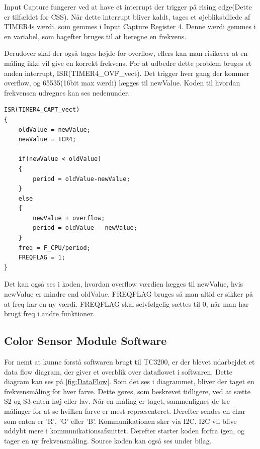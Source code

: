 Input Capture \cite{man:mega2560Kap17} fungerer ved at have et interrupt der trigger på rising edge(Dette er tilfældet for CSS). Når dette interrupt bliver kaldt, tages et øjebliksbillede af TIMER4s værdi, som gemmes i Input Capture Register 4. Denne værdi gemmes i en variabel, som bagefter bruges til at beregne en frekvens. 

Derudover skal der også tages højde for overflow, ellers kan man risikerer at en måling ikke vil give en korrekt frekvens. For at udbedre dette problem bruges et anden interrupt, ISR(TIMER4\_OVF\_vect). Det trigger hver gang der kommer overflow, og 65535(16bit max værdi) lægges til newValue. Koden til hvordan frekvensen udregnes kan ses nedenunder.

\newpage
\begin{lstlisting}
ISR(TIMER4_CAPT_vect)
{
	oldValue = newValue;
	newValue = ICR4;
	
	if(newValue < oldValue)
	{
		period = oldValue-newValue;
	}
	else
	{
		newValue + overflow;
		period = oldValue - newValue;
	}
	freq = F_CPU/period;
	FREQFLAG = 1;
}

\end{lstlisting}

Det kan også ses i koden, hvordan overflow værdien lægges til newValue, hvis newValue er mindre end oldValue. FREQFLAG bruges så man altid er sikker på at freq har en ny værdi. FREQFLAG skal selvfølgelig sættes til 0, når man har brugt freq i andre funktioner.

\subsection{Color Sensor Module Software}
For nemt at kunne forstå softwaren brugt til TC3200, er der blevet udarbejdet et data flow diagram, der giver et overblik over dataflowet i softwaren. Dette diagram kan ses på \autoref{fig:DataFlow}. Som det ses i diagrammet, bliver der taget en frekvensmåling for hver farve. Dette gøres, som beskrevet tidligere, ved at sætte S2 og S3 enten høj eller lav. Når en måling er taget, sammenlignes de tre målinger for at se hvilken farve er mest repræsenteret. Derefter sendes en char som enten er 'R', 'G' eller 'B'. Kommunikationen sker via I2C. I2C vil blive uddybt mere i kommunikationsafsnittet. Derefter starter koden forfra igen, og tager en ny frekvensmåling. Source koden kan også ses under bilag\cite{app:ColorSensor}.

